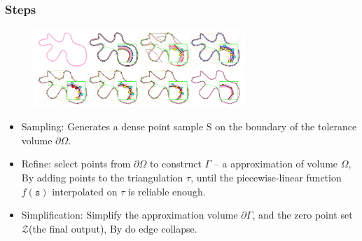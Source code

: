 \documentclass{beamer}
\begin{document}


\begin{frame}
\frametitle{Steps}
\begin{figure}[h]
  \includegraphics[width=8cm]{overview}
\end{figure}
\begin{itemize}
  \item Sampling: Generates a dense point sample S on the boundary of the tolerance volume $\partial \Omega$.
  \item Refine: select points from $\partial \Omega$ to construct $\Gamma$ -- a approximation of volume $\Omega$, By adding points to the triangulation $\tau$, until the piecewise-linear function $f(\mathtt{s})$ interpolated on $\tau$ is reliable enough.
  \item Simplification: Simplify the approximation volume $\partial \Gamma$, and the zero point set $\mathcal{Z}$(the final output), By do edge collapse.
\end{itemize}
\end{frame}

\end{document}
